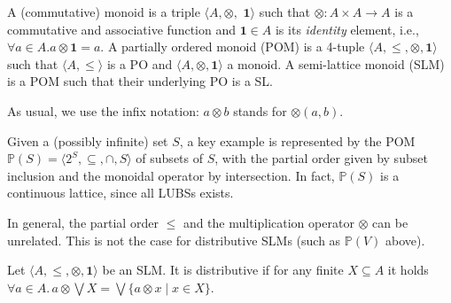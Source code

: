 \documentclass{llncs}
\def\1{{\mathbf 1}}
\newcommand{\comment}[1]{}
\def\monid{{\mathbf 0}}
\def\1{{\mathbf 1}}
\def\monop{\otimes}
\def\monid{\mathbf{1}}
\begin{document}
\begin{definition}\label{defn:clm}
	A (commutative) monoid is a triple
	$\langle A, \monop,$ $\1 \rangle$ such that $\monop: A \times A \rightarrow A$ is
	a commutative and associative function and $\1 \in A$ is its \emph{identity} element,
	i.e., $\forall a \in A. a \monop \1 = a$.
%	
	A partially ordered monoid (POM) is a 4-tuple $\langle A, {\leq,} \monop, \1 \rangle$ such that 	
	$\langle A, \leq \rangle$ is a PO and $\langle A, \monop, \1 \rangle$ a monoid.
	A semi-lattice monoid (SLM) is a 
	POM such that their underlying PO is a SL.
\end{definition}

As usual, we use the infix notation: $a \monop b$ stands for $\monop(a,b)$.
\comment{The monoidal operator can be defined for any multi-set: it is given 
for a family of elements $a_i \in A$ indexed over a non-empty finite
set $I$, and it is denoted by
$\bigotimes_{i \in I} a_i$.
%
If for an index set $I$ the $a_i$'s are different,
we write $\bigotimes S$ instead of $\bigotimes_{i \in I} a_i$
for the set $S = \{a_i \mid i \in I\}$.
%
Conventionally, we denote $\bigotimes \emptyset = \bot$.
}

\begin{example}\label{ex:powerset}
	Given a (possibly infinite) set $S$, a key example
	is represented by the POM $\mathbb{P}(S) = \langle 2^S, \subseteq, \cap, S \rangle$
	of subsets of $S$, with the partial order given by subset inclusion
	and the monoidal operator by intersection. 
	In fact, $\mathbb{P}(S)$ is a continuous lattice, since all LUBSs exists.
\end{example}

In general, the partial order $\leq$ and the multiplication operator $\otimes$ can be unrelated.
This is not the case for distributive SLMs (such as $\mathbb{P}(V)$ above).

\begin{definition}[Distributivity]
\label{dist}
Let $\langle A, \leq, \monop, \monid \rangle$ be an SLM.
It is distributive if
	for  any finite  $X \subseteq A$
		it holds $\forall a \in A.\,  a \monop  \bigvee X = \bigvee \{a \monop x \mid x \in X\}$.
\end{definition}
\end{document}
